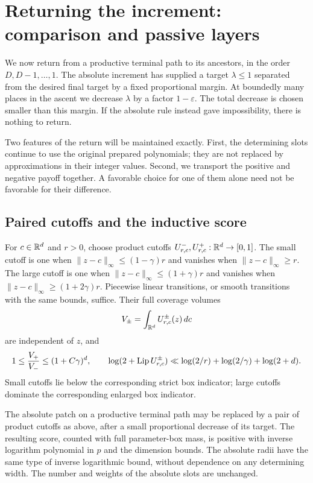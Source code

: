 \section{Returning the increment: comparison and passive layers}\label{ap:ascent}

We now return from a productive terminal path to its ancestors, in the
order $D,D-1,\ldots,1$.  The absolute increment has supplied a target
$\lambda\leq1$ separated from the desired final target by a fixed
proportional margin.  At boundedly many places in the ascent we decrease
$\lambda$ by a factor $1-\varepsilon$.  The total decrease is chosen
smaller than this margin.  If the absolute rule instead gave
impossibility, there is nothing to return.

Two features of the return will be maintained exactly.  First, the
determining slots continue to use the original prepared polynomials;
they are not replaced by approximations in their integer values.
Second, we transport the positive and negative payoff together.  A
favorable choice for one of them alone need not be favorable for their
difference.

\subsection{Paired cutoffs and the inductive score}

For $c\in\mathbb R^d$ and $r>0$, choose product cutoffs
$U^-_{r,c},U^+_{r,c}:\mathbb R^d\to[0,1]$.  The small cutoff is one when
$\|z-c\|_\infty\leq(1-\gamma)r$ and vanishes when
$\|z-c\|_\infty\geq r$.  The large cutoff is one when
$\|z-c\|_\infty\leq(1+\gamma)r$ and vanishes when
$\|z-c\|_\infty\geq(1+2\gamma)r$.  Piecewise linear transitions,
or smooth transitions with the same bounds, suffice.  Their full
coverage volumes
\[
 V_\pm=\int_{\mathbb R^d}U^\pm_{r,c}(z)\,dc
\]
are independent of $z$, and
\begin{equation}\label{ap:ascent:coverage-ratio}
 1\leq \frac{V_+}{V_-}\leq(1+C\gamma)^d,
 \qquad
 \log(2+\operatorname{Lip} U^\pm_{r,c})
 \ll \log(2/r)+\log(2/\gamma)+\log(2+d).
\end{equation}
Small cutoffs lie below the corresponding strict box indicator; large
cutoffs dominate the corresponding enlarged box indicator.

\begin{lemma}\label{ap:ascent:paired-cutoffs}
The absolute patch on a productive terminal path may be replaced by a
pair of product cutoffs as above, after a small proportional decrease
of its target.  The resulting score, counted with full parameter-box
mass, is positive with inverse logarithm polynomial in $p$ and the
dimension bounds.  The absolute radii have the same type of inverse
logarithmic bound, without dependence on any determining width.
The number and weights of the absolute slots are unchanged.
\end{lemma}

